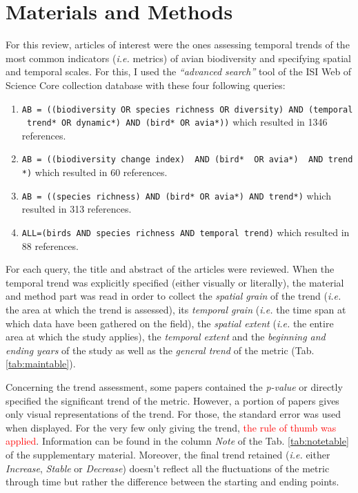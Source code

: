 \documentclass[
  12pt,
  oneside]{report}
\begin{document}
\hypertarget{materials-and-methods}{%
\chapter{Materials and Methods}\label{materials-and-methods}}

For this review, articles of interest were the ones assessing temporal trends of the most common indicators (\emph{i.e.} metrics) of avian biodiversity and specifying spatial and temporal scales. For this, I used the \emph{\enquote{advanced search}} tool of the ISI Web of Science Core collection database with these four following queries:

\begin{enumerate}
\def\labelenumi{\arabic{enumi}.}
\item
  \texttt{AB\ =\ ((biodiversity\ OR\ species\ richness\ OR\ diversity)\ AND\ (temporal\ trend*\ OR\ dynamic*)\ AND\ (bird*\ OR\ avia*))} which resulted in 1346 references.
\item
  \texttt{AB\ =\ ((biodiversity\ change\ index)\ \ AND\ (bird*\ \ OR\ avia*)\ \ AND\ trend*)} which resulted in 60 references.
\item
  \texttt{AB\ =\ ((species\ richness)\ AND\ (bird*\ OR\ avia*)\ AND\ trend*)} which resulted in 313 references.
\item
  \texttt{ALL=(birds\ AND\ species\ richness\ AND\ temporal\ trend)} which resulted in 88 references.
\end{enumerate}

For each query, the title and abstract of the articles were reviewed. When the temporal trend was explicitly specified (either visually or literally), the material and method part was read in order to collect the \emph{spatial grain} of the trend (\emph{i.e.} the area at which the trend is assessed), its \emph{temporal grain} (\emph{i.e.} the time span at which data have been gathered on the field), the \emph{spatial extent} (\emph{i.e.} the entire area at which the study applies), the \emph{temporal extent} and the \emph{beginning and ending years} of the study as well as the \emph{general trend} of the metric (Tab. \ref{tab:maintable}).

Concerning the trend assessment, some papers contained the \emph{p-value} or directly specified the significant trend of the metric. However, a portion of papers gives only visual representations of the trend. For those, the standard error was used when displayed. For the very few only giving the trend, \textcolor{red}{the rule of thumb was applied}. Information can be found in the column \emph{Note} of the Tab. \ref{tab:notetable} of the supplementary material. Moreover, the final trend retained (\emph{i.e.} either \emph{Increase}, \emph{Stable} or \emph{Decrease}) doesn't reflect all the fluctuations of the metric through time but rather the difference between the starting and ending points.
\end{document}
